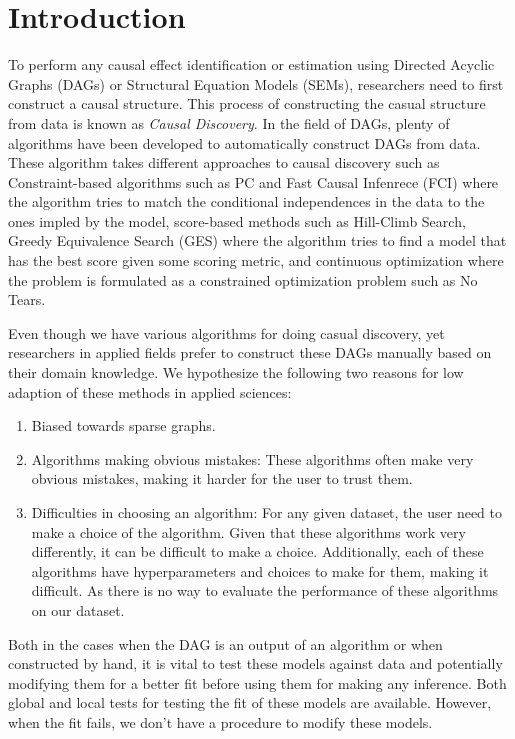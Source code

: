 \documentclass{article}
\begin{document}
\section{Introduction}

To perform any causal effect identification or estimation using Directed
Acyclic Graphs (DAGs) or Structural Equation Models (SEMs), researchers need to
first construct a causal structure. This process of constructing the casual
structure from data is known as \emph{Causal Discovery}. In the field of DAGs,
plenty of algorithms have been developed to automatically construct DAGs from
data. These algorithm takes different approaches to causal discovery such as
Constraint-based algorithms such as PC and Fast Causal Infenrece (FCI) where
the algorithm tries to match the conditional independences in the data to the
ones impled by the model, score-based methods such as Hill-Climb Search, Greedy
Equivalence Search (GES)  where the algorithm tries to find a model that has
the best score given some scoring metric, and continuous optimization where the
problem is formulated as a constrained optimization problem such as No Tears.

Even though we have various algorithms for doing casual discovery, yet
researchers in applied fields prefer to construct these DAGs manually based on
their domain knowledge. We hypothesize the following two reasons for low
adaption of these methods in applied sciences:

\begin{enumerate}
	\item Biased towards sparse graphs.
	\item Algorithms making obvious mistakes: These algorithms often make
		very obvious mistakes, making it harder for the user to trust
		them.
	\item Difficulties in choosing an algorithm: For any given dataset, the
		user need to make a choice of the algorithm. Given that these
		algorithms work very differently, it can be difficult to make a
		choice. Additionally, each of these algorithms have
		hyperparameters and choices to make for them, making it
		difficult. As there is no way to evaluate the performance of
		these algorithms on our dataset.
\end{enumerate}

Both in the cases when the DAG is an output of an algorithm or when constructed
by hand, it is vital to test these models against data and potentially modifying 
them for a better fit before using them for making any inference. Both global
and local tests for testing the fit of these models are available. However, when
the fit fails, we don't have a procedure to modify these models.
\end{document}
